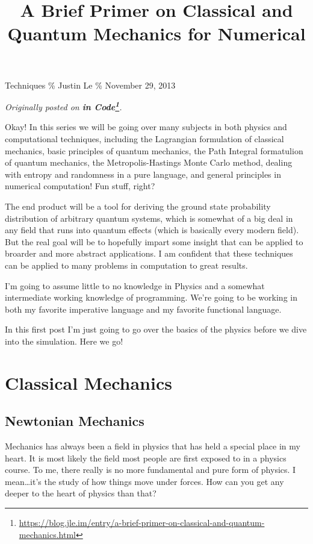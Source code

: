 \documentclass[]{article}
\title{A Brief Primer on Classical and Quantum Mechanics for Numerical}
\renewcommand{\href}[2]{#2\footnote{\url{#1}}}
\begin{document}
\maketitle

Techniques \% Justin Le \% November 29, 2013

\emph{Originally posted on
\textbf{\href{https://blog.jle.im/entry/a-brief-primer-on-classical-and-quantum-mechanics.html}{in
Code}}.}

Okay! In this series we will be going over many subjects in both physics
and computational techniques, including the Lagrangian formulation of
classical mechanics, basic principles of quantum mechanics, the Path
Integral formatulion of quantum mechanics, the Metropolis-Hastings Monte
Carlo method, dealing with entropy and randomness in a pure language,
and general principles in numerical computation! Fun stuff, right?

The end product will be a tool for deriving the ground state probability
distribution of arbitrary quantum systems, which is somewhat of a big
deal in any field that runs into quantum effects (which is basically
every modern field). But the real goal will be to hopefully impart some
insight that can be applied to broarder and more abstract applications.
I am confident that these techniques can be applied to many problems in
computation to great results.

I'm going to assume little to no knowledge in Physics and a somewhat
intermediate working knowledge of programming. We're going to be working
in both my favorite imperative language and my favorite functional
language.

In this first post I'm just going to go over the basics of the physics
before we dive into the simulation. Here we go!

\section{Classical Mechanics}\label{classical-mechanics}

\subsection{Newtonian Mechanics}\label{newtonian-mechanics}

Mechanics has always been a field in physics that has held a special
place in my heart. It is most likely the field most people are first
exposed to in a physics course. To me, there really is no more
fundamental and pure form of physics. I mean\ldots{}it's the study of
how things move under forces. How can you get any deeper to the heart of
physics than that?
\end{document}
